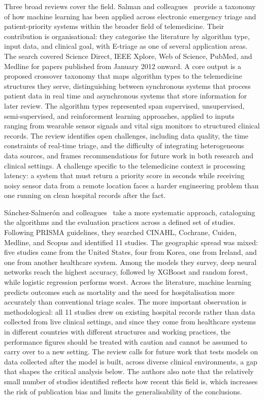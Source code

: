 \documentclass[11pt]{article}
\begin{document}
Three broad reviews cover the field. Salman and colleagues~\cite{Salman2021} provide a taxonomy of how machine learning has been applied across electronic emergency triage and patient-priority systems within the broader field of telemedicine. Their contribution is organisational: they categorise the literature by algorithm type, input data, and clinical goal, with E-triage as one of several application areas. The search covered Science Direct, IEEE Xplore, Web of Science, PubMed, and Medline for papers published from January 2012 onward. A core output is a proposed crossover taxonomy that maps algorithm types to the telemedicine structures they serve, distinguishing between synchronous systems that process patient data in real time and asynchronous systems that store information for later review. The algorithm types represented span supervised, unsupervised, semi-supervised, and reinforcement learning approaches, applied to inputs ranging from wearable sensor signals and vital sign monitors to structured clinical records. The review identifies open challenges, including data quality, the time constraints of real-time triage, and the difficulty of integrating heterogeneous data sources, and frames recommendations for future work in both research and clinical settings. A challenge specific to the telemedicine context is processing latency: a system that must return a priority score in seconds while receiving noisy sensor data from a remote location faces a harder engineering problem than one running on clean hospital records after the fact.

Sánchez-Salmerón and colleagues~\cite{Sanchez2022} take a more systematic approach, cataloguing the algorithms and the evaluation practices across a defined set of studies. Following PRISMA guidelines, they searched CINAHL, Cochrane, Cuiden, Medline, and Scopus and identified 11 studies. The geographic spread was mixed: five studies came from the United States, four from Korea, one from Ireland, and one from another healthcare system. Among the models they survey, deep neural networks reach the highest accuracy, followed by XGBoost and random forest, while logistic regression performs worst. Across the literature, machine learning predicts outcomes such as mortality and the need for hospitalisation more accurately than conventional triage scales. The more important observation is methodological: all 11 studies drew on existing hospital records rather than data collected from live clinical settings, and since they come from healthcare systems in different countries with different structures and working practices, the performance figures should be treated with caution and cannot be assumed to carry over to a new setting. The review calls for future work that tests models on data collected after the model is built, across diverse clinical environments, a gap that shapes the critical analysis below. The authors also note that the relatively small number of studies identified reflects how recent this field is, which increases the risk of publication bias and limits the generalisability of the conclusions.
\end{document}
